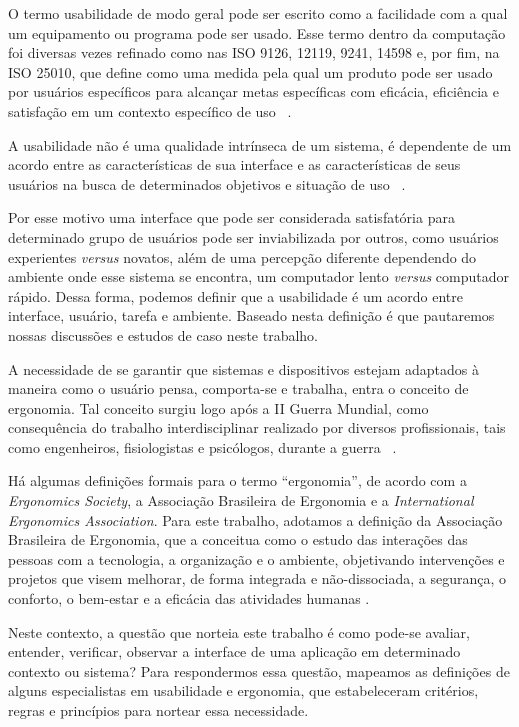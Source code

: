 O termo usabilidade de modo geral pode ser escrito como a facilidade com a qual
um equipamento ou programa pode ser usado. Esse termo dentro da computação foi
diversas vezes refinado como nas ISO 9126, 12119, 9241, 14598 e, por fim, na ISO
25010, que define como uma medida pela qual um produto pode ser usado por
usuários específicos para alcançar metas específicas com eficácia, eficiência e
satisfação em um contexto específico de uso ~\cite{iso25010}.

%
A usabilidade não é uma qualidade intrínseca de um sistema, é dependente de um
acordo entre as características de sua interface e as características de seus
usuários na busca de determinados objetivos e situação de uso ~\cite{cybis2010}.

%
Por esse motivo uma interface que pode ser considerada satisfatória para
determinado grupo de usuários pode ser inviabilizada por outros, como usuários
experientes \textit{versus} novatos, além de uma percepção diferente dependendo
do ambiente onde esse sistema se encontra, um computador lento \textit{versus}
computador rápido.
%
Dessa forma, podemos definir que a usabilidade é um acordo entre interface,
usuário, tarefa e ambiente. Baseado nesta definição é que pautaremos nossas
discussões e estudos de caso neste trabalho.

%
A necessidade de se garantir que sistemas e dispositivos estejam
adaptados à maneira como o usuário pensa, comporta-se e trabalha, entra o
conceito de ergonomia.
%
Tal conceito surgiu logo após a II Guerra Mundial, como consequência do trabalho
interdisciplinar realizado por diversos profissionais, tais como engenheiros,
fisiologistas e psicólogos, durante a guerra ~\cite{lida2005}.

%
Há algumas definições formais para o termo ``ergonomia'', de acordo com a
\textit{Ergonomics Society}, a Associação Brasileira de Ergonomia e a 
\textit{International Ergonomics Association}.
%
Para este trabalho, adotamos a definição da Associação Brasileira de Ergonomia,
que a conceitua como o estudo das interações das pessoas com a tecnologia, a
organização e o ambiente, objetivando intervenções e projetos que visem
melhorar, de forma integrada e não-dissociada, a segurança, o conforto, o
bem-estar e a eficácia das atividades humanas \cite{abergo2013}.

%
Neste contexto, a questão que norteia este trabalho é como pode-se avaliar,
entender, verificar, observar a interface de uma aplicação em determinado
contexto ou sistema?
%
Para respondermos essa questão, mapeamos as definições de alguns especialistas
em usabilidade e ergonomia, que estabeleceram critérios, regras e princípios
para nortear essa necessidade.


